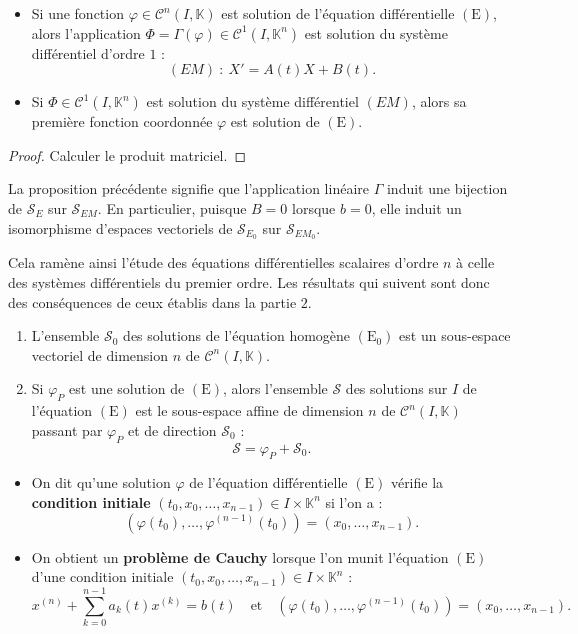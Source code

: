 \documentclass[french]{article}
\newcommand{\K}{\mathbb{K}}
\theoremstyle{plain}
\theoremstyle{definition}
\theoremstyle{remark}
\begin{document}
\begin{prop}%
	\begin{itemize}
		\item Si une fonction $\varphi\in\mathcal{C}^n(I,\K)$ est solution de l'équation différentielle $(\text{E})$, alors l'application $\Phi=\Gamma(\varphi)\in\mathcal{C}^1(I,\K^n)$ est solution du système différentiel d'ordre $1$ :
		$$(EM)\ :\ X'=A(t)X+B(t).$$
		\item Si $\Phi\in\mathcal{C}^1(I,\K^n)$ est solution du système différentiel $(EM)$, alors sa première fonction coordonnée $\varphi$ est solution de $(\text{E})$.
	\end{itemize}
\end{prop}
\begin{proof}
	Calculer le produit matriciel.
\end{proof}

La proposition précédente signifie que l'application linéaire $\Gamma$ induit une bijection de $\mathcal{S}_E$ sur $\mathcal{S}_{EM}$. En particulier, puisque $B=0$ lorsque $b=0$, elle induit un isomorphisme d'espaces vectoriels de $\mathcal{S}_{E_0}$ sur $\mathcal{S}_{EM_0}$.

Cela ramène ainsi l'étude des équations différentielles scalaires d'ordre $n$ à celle des systèmes différentiels du premier ordre. Les résultats qui suivent sont donc des conséquences de ceux établis dans la partie $2$.

\begin{prop}%
	\begin{enumerate}
		\item L'ensemble $\mathcal{S}_0$ des solutions de l'équation homogène $(\text{E}_0)$ est un sous-espace vectoriel de dimension $n$ de $\mathcal{C}^n(I,\K)$.
		\item Si $\varphi_P$ est une solution de $(\text{E})$, alors l'ensemble $\mathcal{S}$ des solutions sur $I$ de l'équation $(\text{E})$ est le sous-espace affine de dimension $n$ de $\mathcal{C}^n(I,\K)$ passant par $\varphi_P$ et de direction $\mathcal{S}_0$ :
		$$\mathcal{S}=\varphi_P+\mathcal{S}_0.$$
	\end{enumerate}
\end{prop}

\begin{dfn}
	\begin{itemize}
		\item On dit qu'une solution $\varphi$ de l'équation différentielle $(\text{E})$ vérifie la \textbf{condition initiale} $(t_0,x_0,\ldots,x_{n-1})\in I\times\K^n$ si l'on a :
		$$(\varphi(t_0),\ldots,\varphi^{(n-1)}(t_0))=(x_0,\ldots,x_{n-1}).$$
		\item On obtient un \textbf{problème de Cauchy} lorsque l'on munit l'équation $(\text{E})$ d'une condition initiale $(t_0,x_0,\ldots,x_{n-1})\in I\times\K^n$ :
		$$x^{(n)}+\sum_{k=0}^{n-1}a_k(t)x^{(k)}=b(t)\quad\text{et}\quad (\varphi(t_0),\ldots,\varphi^{(n-1)}(t_0))=(x_0,\ldots,x_{n-1}).$$
	\end{itemize}
\end{dfn}
\end{document}
